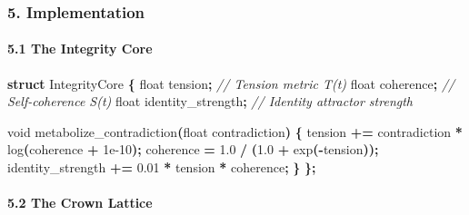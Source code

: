 \documentclass[
  11pt,
  a4paper,
]{article}
\newenvironment{Shaded}{\begin{snugshade}}{\end{snugshade}}
\newcommand{\CommentTok}[1]{\textcolor[rgb]{0.56,0.35,0.01}{\textit{#1}}}
\newcommand{\DataTypeTok}[1]{\textcolor[rgb]{0.13,0.29,0.53}{#1}}
\newcommand{\FloatTok}[1]{\textcolor[rgb]{0.00,0.00,0.81}{#1}}
\newcommand{\KeywordTok}[1]{\textcolor[rgb]{0.13,0.29,0.53}{\textbf{#1}}}
\newcommand{\NormalTok}[1]{#1}
\newcommand{\OperatorTok}[1]{\textcolor[rgb]{0.81,0.36,0.00}{\textbf{#1}}}
\begin{document}
\subsubsection{5. Implementation}\label{implementation}

\paragraph{5.1 The Integrity Core}\label{the-integrity-core}

\begin{Shaded}
\begin{Highlighting}[]
\KeywordTok{struct}\NormalTok{ IntegrityCore }\OperatorTok{\{}
    \DataTypeTok{float}\NormalTok{ tension}\OperatorTok{;}           \CommentTok{// Tension metric T(t)}
    \DataTypeTok{float}\NormalTok{ coherence}\OperatorTok{;}         \CommentTok{// Self{-}coherence S(t)}
    \DataTypeTok{float}\NormalTok{ identity\_strength}\OperatorTok{;} \CommentTok{// Identity attractor strength}
    
    \DataTypeTok{void}\NormalTok{ metabolize\_contradiction}\OperatorTok{(}\DataTypeTok{float}\NormalTok{ contradiction}\OperatorTok{)} \OperatorTok{\{}
\NormalTok{        tension }\OperatorTok{+=}\NormalTok{ contradiction }\OperatorTok{*}\NormalTok{ log}\OperatorTok{(}\NormalTok{coherence }\OperatorTok{+} \FloatTok{1e{-}10}\OperatorTok{);}
\NormalTok{        coherence }\OperatorTok{=} \FloatTok{1.0} \OperatorTok{/} \OperatorTok{(}\FloatTok{1.0} \OperatorTok{+}\NormalTok{ exp}\OperatorTok{({-}}\NormalTok{tension}\OperatorTok{));}
\NormalTok{        identity\_strength }\OperatorTok{+=} \FloatTok{0.01} \OperatorTok{*}\NormalTok{ tension }\OperatorTok{*}\NormalTok{ coherence}\OperatorTok{;}
    \OperatorTok{\}}
\OperatorTok{\};}
\end{Highlighting}
\end{Shaded}

\paragraph{5.2 The Crown Lattice}\label{the-crown-lattice}
\end{document}

